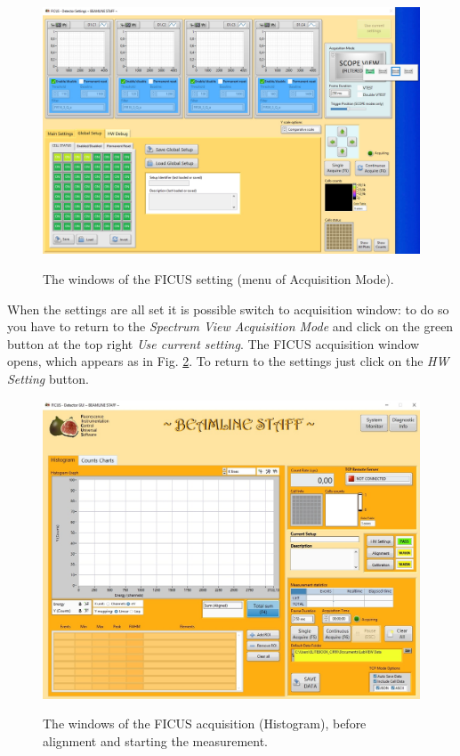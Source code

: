 \documentclass[a4paper,12pt,oneside,pdflatex,italian,final,twocolumn]{article}
\begin{document}
\begin{figure}[h]
\centering
{\includegraphics[width=.95\textwidth]{Cattura106.jpg}} \quad
\caption{The windows of the FICUS setting (menu of Acquisition Mode).}\label{fig:fig43}
\end{figure}

When the settings are all set it is possible switch to acquisition window: to do so you have to return to the \textit{Spectrum View Acquisition Mode} and click on the green button at the top right \textit{Use current setting}.
The FICUS acquisition window opens, which appears as in Fig. \ref{fig:fig44}. To return to the settings just click on the \textit{HW Setting} button.

\begin{figure}[h]
\centering
{\includegraphics[width=.9\textwidth]{Cattura81.jpg}} \quad
\caption{The windows of the FICUS acquisition (Histogram), before alignment and starting the measurement.}\label{fig:fig44}
\end{figure}
\end{document}
